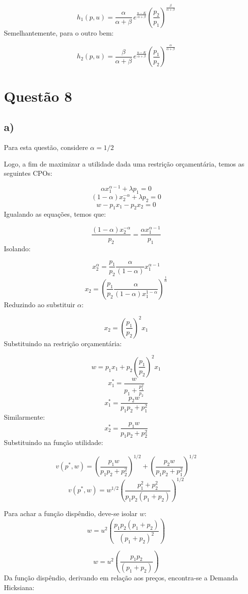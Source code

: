 \documentclass[
  letterpaper,
  DIV=11,
  numbers=noendperiod]{scrartcl}
\begin{document}
\[
h_1(p, u) = \frac{\alpha}{\alpha + \beta} \, e^{\frac{u - K}{\alpha + \beta}} \left( \frac{p_2}{p_1} \right)^{\frac{\beta}{\alpha + \beta}}
\] Semelhantemente, para o outro bem:

\[
h_2(p, u) = \frac{\beta}{\alpha + \beta} \, e^{\frac{u - K}{\alpha + \beta}} \left( \frac{p_1}{p_2} \right)^{\frac{\alpha}{\alpha + \beta}}
\]

\section{Questão 8}\label{questuxe3o-8}

\subsection{a)}\label{a-4}

Para esta questão, considere \(\alpha = 1/2\)

Logo, a fim de maximizar a utilidade dada uma restrição orçamentária,
temos as seguintes CPOs:

\[
\alpha x_1^{\alpha-1} + \lambda p_1 = 0
\] \[
(1-\alpha) x_2^{-\alpha} + \lambda p_2 = 0
\] \[
w - p_1x_1 - p_2x_2 = 0
\] Igualando as equações, temos que:

\[
\frac{(1-\alpha) x_2^{-\alpha}}{p_2} = \frac{\alpha x_1^{\alpha-1}}{p_1}
\] Isolando:

\[
x_2^\alpha = \frac{p_1}{p_2}\frac{\alpha}{(1-\alpha)}x_1^{\alpha-1}
\] \[
x_2 = \left(\frac{p_1}{p_2}\frac{\alpha}{(1-\alpha)x_1^{1-\alpha}}\right)^\frac{1}{\alpha}
\] Reduzindo ao substituir \(\alpha\):

\[
x_2 = \left(\frac{p_1}{p_2}\right)^2x_1
\] Substituindo na restrição orçamentária:

\[
w = p_1x_1 + p_2\left(\frac{p_1}{p_2}\right)^2x_1
\] \[
x_1^* = \frac{w}{p_1+\frac{p_1^2}{p_2}}
\] \[
x_1^* = \frac{p_2w}{p_1p_2+p_1^2}
\] Similarmente: \[
x_2^* = \frac{p_1w}{p_1p_2+p_2^2}
\] Substituindo na função utilidade:

\[
v(p^*, w) = \left(\frac{p_1w}{p_1p_2+p_2^2}\right)^{1/2} + \left(\frac{p_2w}{p_1p_2+p_1^2}\right)^{1/2}
\] \[
v(p^*, w) = w^{1/2}\left(\frac{p_1^2+p_2^2}{p_1p_2(p_1+p_2)}\right)^{1/2}
\]

Para achar a função dispêndio, deve-se isolar \(w\): \[
w = u^2\left(\frac{p_1p_2(p_1+p_2)}{(p_1+p_2)^2}\right)
\]

\[
w = u^2\left(\frac{p_1p_2}{(p_1+p_2)}\right)
\] Da função dispêndio, derivando em relação aos preços, encontra-se a
Demanda Hicksiana:
\end{document}
